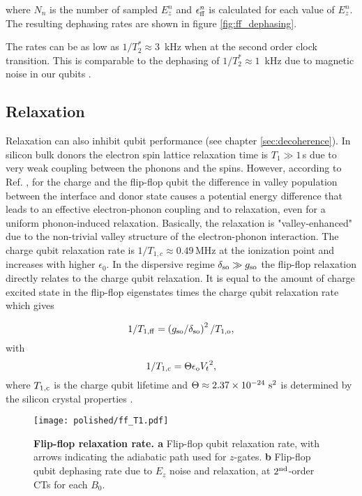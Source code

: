 where $N_n$ is the number of sampled $E_z^n$ and $\epsilon_{\rm ff}^n$ is calculated for each value of $E_z^n$. The resulting dephasing rates are shown in figure \ref{fig:ff_dephasing}. 

The rates can be as low as $1/T_2^{\ast} \approx 3$~kHz when at the second order clock transition. This is comparable to the dephasing of $1/T_2^{\ast} \approx 1$~kHz due to magnetic noise in our qubits \cite{Muhonen2014}. 

\subsection{Relaxation} \label{sec:ff_relax}

Relaxation can also inhibit qubit performance (see chapter \ref{sec:decoherence}). In silicon bulk donors the electron spin lattice relaxation time is $T_1\gg 1\,$s due to very weak coupling between the phonons and the spins. However, according to Ref. \cite{Boross2016},  for the charge and the flip-flop qubit the difference in valley population between the interface and donor state causes a potential energy difference that leads to an effective electron-phonon coupling and to relaxation, even for a uniform phonon-induced relaxation. Basically, the relaxation is "valley-enhanced" due to the non-trivial valley structure of the electron-phonon interaction. The charge qubit relaxation rate is $1/T_{1,c}\approx 0.49\,$MHz at the ionization point and increases with higher $\epsilon_0$. 
In the dispersive regime $\delta_{\rm so}\gg g_{\rm so}$ the flip-flop relaxation directly relates to the charge qubit relaxation. It is equal to the amount of charge excited state in the flip-flop eigenstates times the charge qubit relaxation rate which gives

\begin{equation}\label{eq:T1ff}
{1}/{T_{1,\rm ff}}=\left({g_{\rm so}}/{\delta_{\rm so}}\right)^2/{T_{1,\rm o}},
\end{equation}
with 
\begin{equation}\label{eq:T1o}
{1}/{T_{1,\rm c}}=\Theta\epsilon_{\rm o}{V_t}^2,
\end{equation}
where $T_{1,\rm c}$ is the charge qubit lifetime and $\Theta\approx2.37\times10^{-24}~{\rm s}^2$ is determined by the silicon crystal properties \cite{Boross2016}.

\begin{figure}[h]
	\centering
	\texttt{[image: polished/ff\_T1.pdf]}
	\caption[Flip-flop relaxation rate]{\textbf{Flip-flop relaxation rate. a }Flip-flop qubit relaxation rate, with arrows indicating the adiabatic path used for $z$-gates. \textbf{b} Flip-flop qubit dephasing rate due to $E_z$ noise and relaxation, at $2^{\rm nd}$-order CTs for each $B_0$.}
	\label{fig:T1}
\end{figure}

